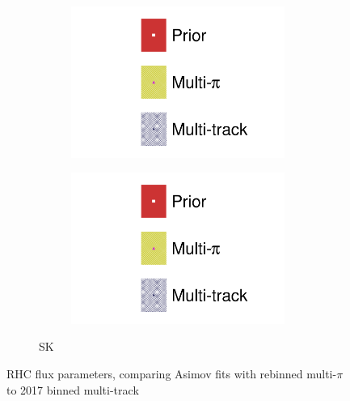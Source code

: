 \begin{figure}[h]
\begin{subfigure}[t]{\textwidth}
\begin{subfigure}[t]{0.24\textwidth}
		\includegraphics[width=\textwidth,page=16, trim={0mm 0mm 0mm 9mm}, clip]{figures/mach3/2018/asimov/2018a_FixedCov_RedCov_Mpi_Asimov_merg_2018a_NewDetMatrix_OrderSwitched_Data2to8_merge}
	\end{subfigure}
	\begin{subfigure}[t]{0.24\textwidth}
		\includegraphics[width=\textwidth,page=17, trim={0mm 0mm 0mm 9mm}, clip]{figures/mach3/2018/asimov/2018a_FixedCov_RedCov_Mpi_Asimov_merg_2018a_NewDetMatrix_OrderSwitched_Data2to8_merge}
	\end{subfigure}
\caption{SK}
\end{subfigure}
	\caption{RHC flux parameters, comparing Asimov fits with rebinned multi-$\pi$ to 2017 binned multi-track}
	\label{fig:asimov_fit_2018_mpi_mtrack_rhc}
\end{figure}

